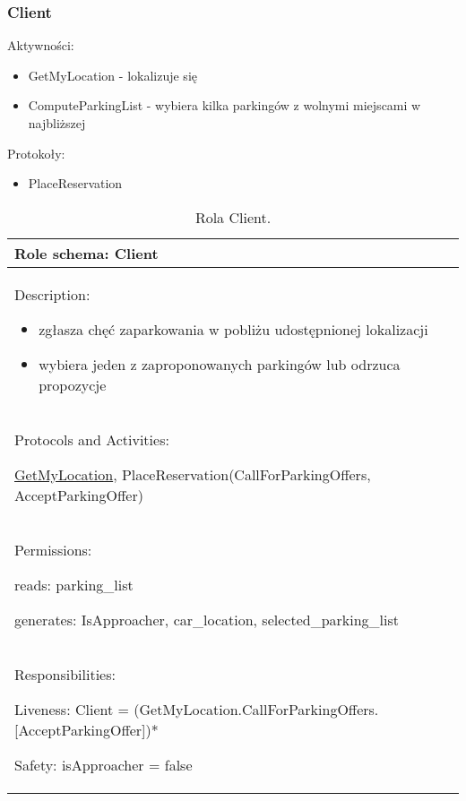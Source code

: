 \newpage
\subsubsection{Client}

Aktywności:
\begin{itemize}
    \item GetMyLocation - lokalizuje się
    \item ComputeParkingList - wybiera kilka parkingów z wolnymi miejscami w najbliższej

\end{itemize}

Protokoły:
\begin{itemize}
    \item PlaceReservation
\end{itemize}


\begin{table}[!h] \label{tab:rola1} \centering
    \caption{Rola Client.}
    \begin{tabular} {| p{14cm} |} \hline
        Role schema: Client \\ \hline
        Description:

        \begin{itemize}
            \item zgłasza chęć zaparkowania w pobliżu udostępnionej lokalizacji
            \item wybiera jeden z zaproponowanych parkingów lub odrzuca propozycje
            
        \end{itemize} \\ \hline
        Protocols and Activities: 
        
        \ul{GetMyLocation}, PlaceReservation(CallForParkingOffers, AcceptParkingOffer) \\ \hline
        Permissions:

        reads: parking\_list

        generates:  IsApproacher, car\_location, selected\_parking\_list \\ \hline
        Responsibilities:

        Liveness: Client = (GetMyLocation.CallForParkingOffers.[AcceptParkingOffer])*


        Safety: isApproacher = false \\ \hline
    \end{tabular}
\end{table}

\newpage

